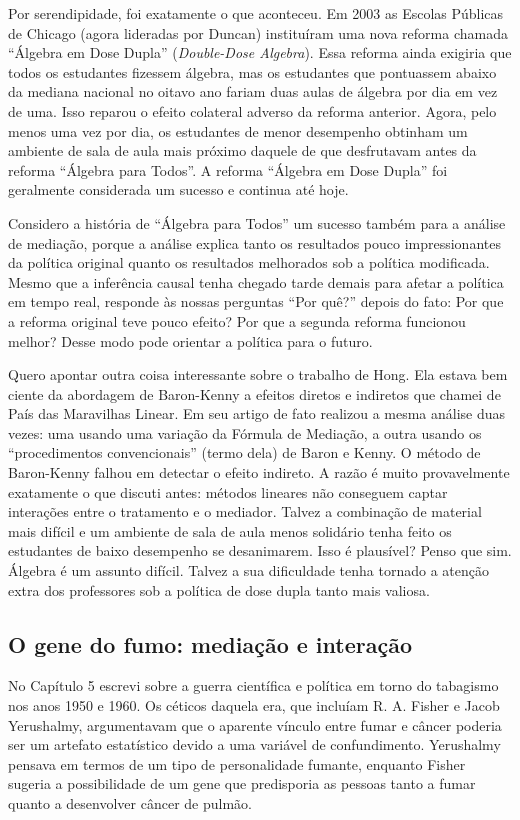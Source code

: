 \documentclass[11pt,a5paper,twoside]{book}
\begin{document}
Por serendipidade, foi exatamente o que aconteceu. Em 2003 as Escolas Públicas de Chicago (agora lideradas por Duncan) instituíram uma nova reforma chamada “Álgebra em Dose Dupla” (\textit{Double-Dose Algebra}). Essa reforma ainda exigiria que todos os estudantes fizessem álgebra, mas os estudantes que pontuassem abaixo da mediana nacional no oitavo ano fariam duas aulas de álgebra por dia em vez de uma. Isso reparou o efeito colateral adverso da reforma anterior. Agora, pelo menos uma vez por dia, os estudantes de menor desempenho obtinham um ambiente de sala de aula mais próximo daquele de que desfrutavam antes da reforma “Álgebra para Todos”. A reforma “Álgebra em Dose Dupla” foi geralmente considerada um sucesso e continua até hoje.

Considero a história de “Álgebra para Todos” um sucesso também para a análise de mediação, porque a análise explica tanto os resultados pouco impressionantes da política original quanto os resultados melhorados sob a política modificada. Mesmo que a inferência causal tenha chegado tarde demais para afetar a política em tempo real, responde às nossas perguntas “Por quê?” depois do fato: Por que a reforma original teve pouco efeito? Por que a segunda reforma funcionou melhor? Desse modo pode orientar a política para o futuro.

Quero apontar outra coisa interessante sobre o trabalho de Hong. Ela estava bem ciente da abordagem de Baron-Kenny a efeitos diretos e indiretos que chamei de País das Maravilhas Linear. Em seu artigo de fato realizou a mesma análise duas vezes: uma usando uma variação da Fórmula de Mediação, a outra usando os “procedimentos convencionais” (termo dela) de Baron e Kenny. O método de Baron-Kenny falhou em detectar o efeito indireto. A razão é muito provavelmente exatamente o que discuti antes: métodos lineares não conseguem captar interações entre o tratamento e o mediador. Talvez a combinação de material mais difícil e um ambiente de sala de aula menos solidário tenha feito os estudantes de baixo desempenho se desanimarem. Isso é plausível? Penso que sim. Álgebra é um assunto difícil. Talvez a sua dificuldade tenha tornado a atenção extra dos professores sob a política de dose dupla tanto mais valiosa.

\subsection{O gene do fumo: mediação e interação}
No Capítulo 5 escrevi sobre a guerra científica e política em torno do tabagismo nos anos 1950 e 1960. Os céticos daquela era, que incluíam R. A. Fisher e Jacob Yerushalmy, argumentavam que o aparente vínculo entre fumar e câncer poderia ser um artefato estatístico devido a uma variável de confundimento. Yerushalmy pensava em termos de um tipo de personalidade fumante, enquanto Fisher sugeria a possibilidade de um gene que predisporia as pessoas tanto a fumar quanto a desenvolver câncer de pulmão.
\end{document}
